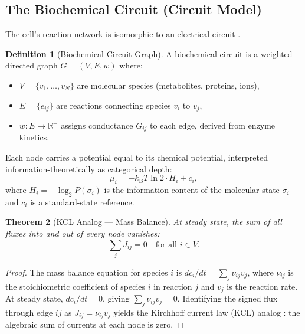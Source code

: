 \documentclass[twocolumn,10pt,a4paper]{article}
\newtheorem{theorem}{Theorem}[section]
\theoremstyle{definition}
\newtheorem{definition}[theorem]{Definition}
\theoremstyle{remark}
\newcommand{\kB}{k_{\mathrm{B}}}
\begin{document}
\subsection{The Biochemical Circuit (Circuit Model)}
\label{sec:circuit}

The cell's reaction network is isomorphic to an electrical circuit \citep{Sachikonye2024d}.

\begin{definition}[Biochemical Circuit Graph]
\label{def:circuit}
A biochemical circuit is a weighted directed graph $G = (V, E, w)$ where:
\begin{itemize}[nosep]
    \item $V = \{v_1, \ldots, v_N\}$ are molecular species (metabolites, proteins, ions),
    \item $E = \{e_{ij}\}$ are reactions connecting species $v_i$ to $v_j$,
    \item $w: E \to \mathbb{R}^+$ assigns conductance $G_{ij}$ to each edge, derived from enzyme kinetics.
\end{itemize}
Each node carries a potential equal to its chemical potential, interpreted information-theoretically as categorical depth:
\begin{equation}
    \mu_i = -\kB T \ln 2 \cdot H_i + c_i,
    \label{eq:chem_potential}
\end{equation}
where $H_i = -\log_2 P(\sigma_i)$ is the information content of the molecular state $\sigma_i$ and $c_i$ is a standard-state reference.
\end{definition}

\begin{theorem}[KCL Analog --- Mass Balance]
\label{thm:KCL}
At steady state, the sum of all fluxes into and out of every node vanishes:
\begin{equation}
    \sum_j J_{ij} = 0 \quad \text{for all } i \in V.
    \label{eq:KCL}
\end{equation}
\end{theorem}

\begin{proof}
The mass balance equation for species $i$ is $dc_i/dt = \sum_j \nu_{ij} v_j$, where $\nu_{ij}$ is the stoichiometric coefficient of species $i$ in reaction $j$ and $v_j$ is the reaction rate. At steady state, $dc_i/dt = 0$, giving $\sum_j \nu_{ij} v_j = 0$. Identifying the signed flux through edge $ij$ as $J_{ij} = \nu_{ij} v_j$ yields the Kirchhoff current law (KCL) analog \citep{Kirchhoff1845}: the algebraic sum of currents at each node is zero.
\end{proof}
\end{document}
